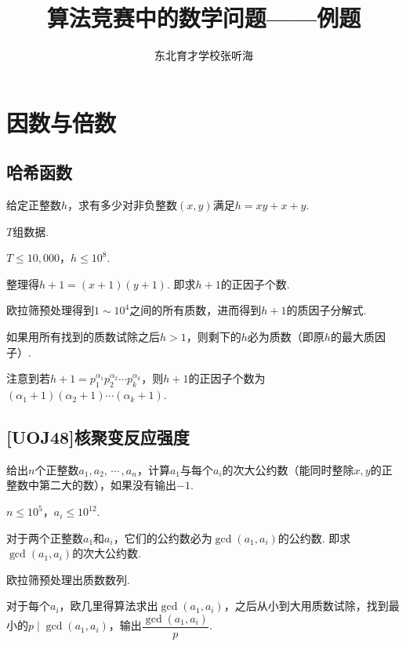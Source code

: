 \documentclass[a4paper]{article}
\title{算法竞赛中的数学问题——例题}
\author{东北育才学校\quad 张听海}
\def\tcdots{\,\!\cdots\!\,}
\def\bkh{\!\!（}
\def\ekh{）\!\!}
\def\leq{\leqslant}
\begin{document}
    \renewcommand{\baselinestretch}{1.25}\normalsize
    \setlength{\parindent}{2em}
    \setlength{\abovedisplayskip}{1pt}
    \setlength{\belowdisplayskip}{1pt}
    \pagestyle{plain}

    \maketitle

    \tableofcontents

    \newpage

    \section{因数与倍数}

    \subsection{哈希函数}

    给定正整数$h$，\!\!求有多少对非负整数$(x,y)$满足$h=xy+x+y$.

    $T$组数据.

    $T\leq 10,000$，\!\!$h\leq {10}^8$.

    整理得$h+1=(x+1)(y+1)$. 即求$h+1$的正因子个数.

    欧拉筛预处理得到$1\sim {10}^4$之间的所有质数，\!\!进而得到$h+1$的质因子分解式.

    如果用所有找到的质数试除之后$h>1$，\!\!则剩下的$h$必为质数\bkh 即原$h$的最大质因子\ekh .

    注意到若$h+1=p_1^{\alpha_1}p_2^{\alpha_2}\cdots p_k^{\alpha_k}$，\!\!则$h+1$的正因子个数为$(\alpha_1+1)(\alpha_2+1)\cdots(\alpha_k+1)$.

    \subsection{[UOJ48]核聚变反应强度}

    给出$n$个正整数$a_1,a_2,\tcdots,a_n$，\!\!计算$a_1$与每个$a_i$的次大公约数\bkh 能同时整除$x,y$的正整数中第二大的数\ekh，\!\!如果没有输出$-1$.

    $n\leq {10}^5$，\!\!$a_i\leq {10}^{12}$.

    对于两个正整数$a_1$和$a_i$，\!\!它们的公约数必为$\gcd(a_1,a_i)$的公约数. 即求$\gcd(a_1,a_i)$的次大公约数.

    欧拉筛预处理出质数数列.

    对于每个$a_i$，\!\!欧几里得算法求出$\gcd(a_1,a_i)$，\!\!之后从小到大用质数试除，\!\!找到最小的$p\mid\gcd(a_1,a_i)$，\!\!输出$\dfrac{\gcd(a_1,a_i)}{p}$.
\end{document}

